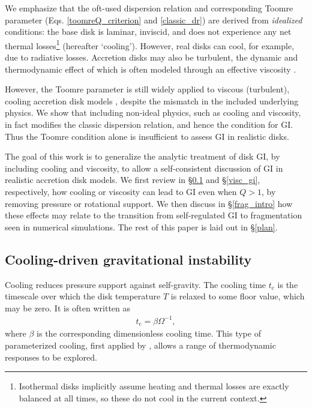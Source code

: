 \documentclass[iop, numberedappendix]{emulateapj}
\newcommand{\p}{\partial}
\newcommand{\tcool}{t_\mathrm{c}}
\begin{document}
We emphasize that the oft-used dispersion relation and corresponding
Toomre parameter (Eqs. \ref{toomreQ_criterion} and \ref{classic_dr})
are derived from \emph{idealized} conditions:  
the base disk is laminar, inviscid, and does not experience any net thermal 
losses\footnote{Isothermal disks implicitly assume  
  heating and thermal losses are exactly balanced at all 
  times, so these do not cool in the current context.} 
(hereafter `cooling').  
However, real disks can cool, for example, %
due to radiative losses. Accretion disks may also be turbulent, the 
dynamic and thermodynamic effect of which is often modeled through an 
effective viscosity \citep{shakura73,lin87,armitage01,rafikov15}. 

However, the Toomre parameter  
is still widely applied to viscous (turbulent), cooling
accretion disk models \citep[e.g.][]{gammie01,cossins09, kimura12}, 
despite the mismatch in the included underlying physics. 
We show that including non-ideal physics, such as cooling and
viscosity, in fact modifies the classic dispersion 
relation, and hence the condition for GI. Thus the Toomre condition
alone is insufficient to assess GI in realistic disks.  

The goal of this work is to generalize the analytic treatment of disk
GI, by including cooling and viscosity, to allow 
a self-consistent discussion of GI in realistic accretion disk
models.  
We first review in \S\ref{cool_gi} and \S\ref{visc_gi}, respectively,  
how cooling or viscosity can lead to GI even when $Q>1$, by removing
pressure or rotational support. We then 
discuss in \S\ref{frag_intro} how these effects may relate   
to the transition from self-regulated GI to fragmentation seen in
numerical simulations. The rest of this paper is laid out in
\S\ref{plan}.    



\subsection{Cooling-driven gravitational instability}\label{cool_gi}
Cooling reduces pressure support against self-gravity. The
cooling time  
$\tcool$ is the timescale over which the disk temperature $T$ is relaxed
to some floor value, which may be zero. 
 It is often written as 
\begin{align} \label{beta_def}
  \tcool = \beta \Omega^{-1},
\end{align}
where $\beta$ is the corresponding dimensionless cooling time. This
type of parameterized cooling, first applied by \cite{gammie01},
allows a range of thermodynamic responses to be explored. 
\end{document}
